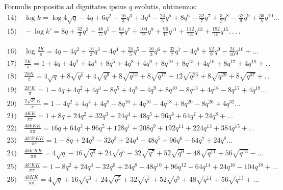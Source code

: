 \documentclass{article}
\begin{document}
Formulis propositis ad dignitates ipsius $q$ evolutis, obtinemus:
\[
\begin{gathered}
\text{14)}\quad\log k=\log4\sqrt{q}-4q+6q^{2}-\frac{16}{3}q^{3}+3q^{4}-\frac{24}{5}q^{5}+8q^{6}-\frac{32}{7}q^{7}+\frac{3}{2}q^{8}-\frac{52}{9}q^{9}+\frac{36}{5}q^{10}\ldots\\[2ex]
\text{15)}\quad-\log k'=8q+\frac{32}{3}q^{3}+\frac{48}{5}q^{5}+\frac{64}{7}q^{7}+\frac{104}{9}q^{9}+\frac{96}{11}q^{11}+\frac{112}{13}q^{13}+\frac{192}{15}q^{15}.\,.\,.\,.
\end{gathered}
\]

\[
\begin{gathered}
\text{16)}\quad\log\frac{2K}{\pi}=4q-4q^{2}+\frac{16}{3}q^{3}-4q^{4}+\frac{24}{5}q^{5}-\frac{16}{3}q^{6}+\frac{32}{7}q^{7}-4q^{8}+\frac{52}{9}q^{9}-\frac{24}{10}q^{10}+\ldots\\[2ex]
\text{17)}\quad\frac{2K}{\pi}=1+4q+4q^{2}+4q^{4}+8q^{5}+4q^{8}+4q^{9}+8q^{10}+8q^{13}+4q^{16}+8q^{17}+4q^{18}+.\,.\\[2ex]
\text{18)}\quad\frac{2kK}{\pi}=4\sqrt{q}+8\sqrt{q^{5}}+4\sqrt{q^{9}}+8\sqrt{q^{13}}+8\sqrt{q^{17}}+12\sqrt{q^{25}}+8\sqrt{q^{29}}+8\sqrt{q^{37}}+.\,.\\[2ex]
\text{19)}\quad\frac{2k'K}{\pi}=1-4q+4q^{2}+4q^{4}-8q^{5}+4q^{8}-4q^{9}+8q^{10}-8q^{13}+4q^{16}-8q^{17}+4q^{18}\ldots\\[2ex]
\text{20)}\quad\frac{2\sqrt{k'}K}{\pi}=1-4q^{2}+4q^{4}+4q^{8}-8q^{10}+4q^{16}-4q^{18}+8q^{20}-8q^{26}+4q^{32}\ldots\\[2ex]
\text{21)}\quad\frac{4KK}{\pi\pi}=1+8q+24q^{2}+32q^{3}+24q^{4}+48q^{5}+96q^{6}+64q^{7}+24q^{8}+\ldots\\[2ex]
\text{22)}\quad\frac{4kkKK}{\pi\pi}=16q+64q^{3}+96q^{5}+128q^{7}+208q^{9}+192q^{11}+224q^{13}+384q^{15}+.\,.\\[2ex]
\text{23)}\quad\frac{4k'k'KK}{\pi\pi}=1-8q+24q^{2}-32q^{3}+24q^{4}-48q^{5}+96q^{6}-64q^{7}+24q^{8}\ldots\\[2ex]
\text{24)}\quad\frac{4kk'KK}{\pi\pi}=4\sqrt{q}-16\sqrt{q^{3}}+24\sqrt{q^{5}}-32\sqrt{q^{7}}+52\sqrt{q^{9}}-48\sqrt{q^{11}}+56\sqrt{q^{13}}-\ldots\\[2ex]
\text{25)}\quad\frac{4k'KK}{\pi\pi}=1-8q^{2}+24q^{4}-32q^{6}+24q^{8}-48q^{10}+96q^{12}-64q^{14}+24q^{16}-104q^{18}+\ldots\\[2ex]
\text{26)}\quad\frac{4kKK}{\pi\pi}=4\sqrt{q}+16\sqrt{q^{3}}+24\sqrt{q^{5}}+32\sqrt{q^{7}}+52\sqrt{q^{9}}+48\sqrt{q^{11}}+56\sqrt{q^{13}}+\ldots
\end{gathered}
\]
\end{document}
